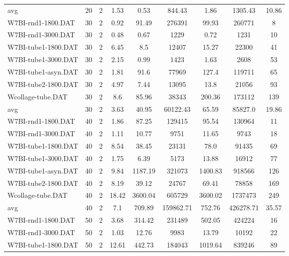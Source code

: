 \begin{table}[!ht]
{\begin{tabular}{lcccccccc}
\cline{1-9} avg & 20 & 2 & 1.53 & 0.53& 844.43 & 1.86& 1305.43 & 10.86\\ \cline{1-9}
W7BI-rnd1-1800.DAT & 30 & 2 &  \textcolor{blue2}{0.92} & 91.49 & 276391 & 99.93 & 260771 & 8 \\
W7BI-rnd1-3000.DAT & 30 & 2 &  \textcolor{blue2}{0.48} & 0.67 & 1229 & 0.72 & 1231 & 10 \\
W7BI-tube1-1800.DAT & 30 & 2 &  \textcolor{blue2}{6.45} & 8.5 & 12407 & 15.27 & 22300 & 41 \\
W7BI-tube1-3000.DAT & 30 & 2 & 2.15 &  \textcolor{blue2}{0.99} & 1423 & 1.63 & 2608 & 53 \\
W7BI-tube1-asyn.DAT & 30 & 2 &  \textcolor{blue2}{1.81} & 91.6 & 77969 & 127.4 & 119711 & 65 \\
W7BI-tube2-1800.DAT & 30 & 2 &  \textcolor{blue2}{4.97} & 7.44 & 13095 & 13.8 & 21056 & 93 \\
Wcollage-tube.DAT & 30 & 2 &  \textcolor{blue2}{8.6} & 85.96 & 38343 & 200.36 & 173112 & 139 \\
\cline{1-9} avg & 30 & 2 & 3.63 & 40.95& 60122.43 & 65.59& 85827.0 & 19.86\\ \cline{1-9}
W7BI-rnd1-1800.DAT & 40 & 2 &  \textcolor{blue2}{1.86} & 87.25 & 129415 & 95.54 & 130964 & 11 \\
W7BI-rnd1-3000.DAT & 40 & 2 &  \textcolor{blue2}{1.11} & 10.77 & 9751 & 11.65 & 9743 & 18 \\
W7BI-tube1-1800.DAT & 40 & 2 &  \textcolor{blue2}{8.54} & 38.45 & 23131 & 78.0 & 91435 & 69 \\
W7BI-tube1-3000.DAT & 40 & 2 &  \textcolor{blue2}{1.75} & 6.39 & 5173 & 13.88 & 16912 & 77 \\
W7BI-tube1-asyn.DAT & 40 & 2 &  \textcolor{blue2}{9.84} & 1187.19 & 321073 & 1400.83 & 918566 & 126 \\
W7BI-tube2-1800.DAT & 40 & 2 &  \textcolor{blue2}{8.19} & 39.12 & 24767 & 69.41 & 78858 & 169 \\
Wcollage-tube.DAT & 40 & 2 &  \textcolor{blue2}{18.42} & 3600.04 & 605729 & 3600.02 & 1737473 & 249 \\
\cline{1-9} avg & 40 & 2 & 7.1 & 709.89& 159862.71 & 752.76& 426278.71 & 35.57\\ \cline{1-9}
W7BI-rnd1-1800.DAT & 50 & 2 &  \textcolor{blue2}{3.68} & 314.42 & 231489 & 502.05 & 424224 & 16 \\
W7BI-rnd1-3000.DAT & 50 & 2 &  \textcolor{blue2}{1.03} & 12.76 & 9983 & 13.79 & 10192 & 22 \\
W7BI-tube1-1800.DAT & 50 & 2 &  \textcolor{blue2}{12.61} & 442.73 & 184043 & 1019.64 & 839246 & 89 \\

\end{tabular}}
\end{table}
